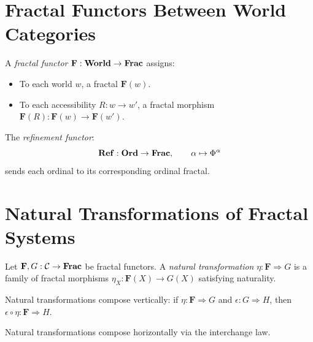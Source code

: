 \section{Fractal Functors Between World Categories}

\begin{definition}
\label{def:frac-functor}
A \emph{fractal functor} $\mathbf{F}: \mathbf{World} \to \mathbf{Frac}$ assigns:
\begin{itemize}
    \item To each world $w$, a fractal $\mathbf{F}(w)$.
    \item To each accessibility $R: w \to w'$, a fractal morphism
          $\mathbf{F}(R): \mathbf{F}(w) \to \mathbf{F}(w')$.
\end{itemize}
\end{definition}

\begin{example}
\label{ex:refinement-functor}
The \emph{refinement functor}:
\[
    \mathbf{Ref}: \mathbf{Ord} \to \mathbf{Frac}, \qquad \alpha \mapsto \Phi^{\alpha}
\]
sends each ordinal to its corresponding ordinal fractal.
\end{example}

\section{Natural Transformations of Fractal Systems}

\begin{definition}
\label{def:nat-trans}
Let $\mathbf{F}, G: \mathcal{C} \to \mathbf{Frac}$ be fractal functors.
A \emph{natural transformation} $\eta: \mathbf{F} \Rightarrow G$ is a
family of fractal morphisms $\eta_X: \mathbf{F}(X) \to G(X)$ satisfying naturality.
\end{definition}

\begin{theorem}
\label{thm:vertical-comp}
Natural transformations compose vertically: if $\eta: \mathbf{F} \Rightarrow G$
and $\epsilon: G \Rightarrow H$, then $\epsilon \circ \eta: \mathbf{F} \Rightarrow H$.
\end{theorem}

\begin{theorem}
\label{thm:horizontal-comp}
Natural transformations compose horizontally via the interchange law.
\end{theorem}

